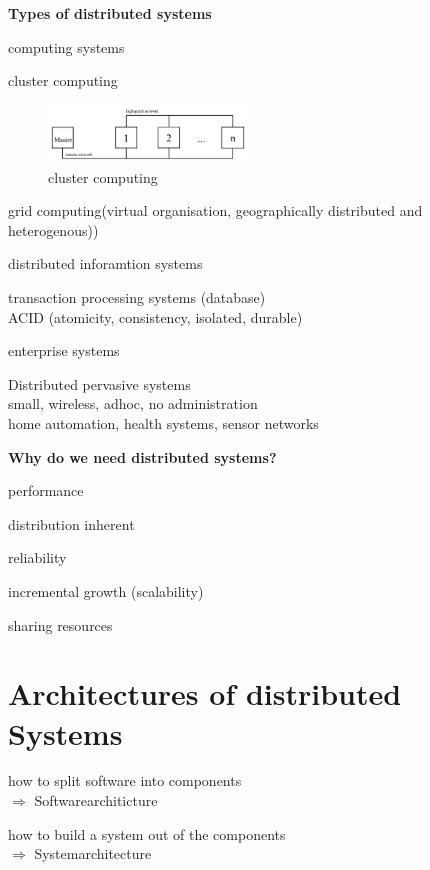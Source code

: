 \documentclass[ngerman,a4paper]{report}
\begin{document}
\textbf{Types of distributed systems}
\begin{compactitem}
\item computing systems
\begin{compactitem}
\item cluster computing
\begin{figure}[h]
	\centering
	\includegraphics[width=200px]{gfx/cluster_computing.png}
	\caption{cluster computing}
	\label{img:cluster_comp}
\end{figure}
\item grid computing(virtual organisation, geographically distributed and heterogenous))
\end{compactitem}
\item distributed inforamtion systems
\begin{compactitem}
\item transaction processing systems (database) \\
ACID (atomicity, consistency, isolated, durable)
\item enterprise systems
\end{compactitem}
\item Distributed pervasive systems\\
small, wireless, adhoc, no administration\\
home automation, health systems, sensor networks
\end{compactitem}

\textbf{Why do we need distributed systems?}\\
\begin{compactitem}
\item performance
\item distribution inherent
\item reliability
\item incremental growth (scalability)
\item sharing resources
\end{compactitem}

\chapter{Architectures of distributed Systems}

\begin{compactitem}
\item how to split software into components\\
$\Rightarrow$ Softwarearchiticture
\item how to build a system out of the components\\
$\Rightarrow$ Systemarchitecture
\end{compactitem}
\end{document}
